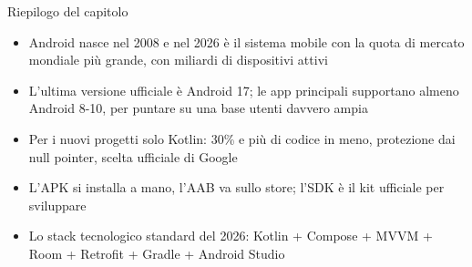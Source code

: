 \begin{tcbsummary}{Riepilogo del capitolo}
\begin{itemize}
  \item Android nasce nel 2008 e nel 2026 è il sistema mobile con la quota di mercato mondiale più grande, con miliardi di dispositivi attivi
  \item L'ultima versione ufficiale è Android 17; le app principali supportano almeno Android 8-10, per puntare su una base utenti davvero ampia
  \item Per i nuovi progetti solo Kotlin: 30\% e più di codice in meno, protezione dai null pointer, scelta ufficiale di Google
  \item L'APK si installa a mano, l'AAB va sullo store; l'SDK è il kit ufficiale per sviluppare
  \item Lo stack tecnologico standard del 2026: Kotlin + Compose + MVVM + Room + Retrofit + Gradle + Android Studio
\end{itemize}

\end{tcbsummary}
